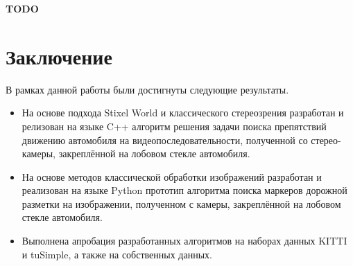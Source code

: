 \documentclass[aps,%
14pt,%
final,%
oneside,
onecolumn,%
musixtex, %
superscriptaddress,%
centertags]{extarticle} %
\begin{document}
\textbf{\Large TODO}

\section{Заключение}

В рамках данной работы были достигнуты следующие результаты.

\begin{itemize}
\item На основе подхода Stixel World и классического стереозрения разработан и релизован на языке C++ алгоритм решения задачи поиска препятствий движению автомобиля на видеопоследовательности, полученной со стерео-камеры, закреплённой на лобовом стекле автомобиля.

\item На основе методов классической обработки изображений разработан и реализован на языке Python прототип алгоритма поиска маркеров дорожной разметки на изображении, полученном с камеры, закреплённой на лобовом стекле автомобиля.

\item Выполнена апробация разработанных алгоритмов на наборах данных KITTI и tuSimple, а также на собственных данных.

\end{itemize}

\newpage



\end{document}
